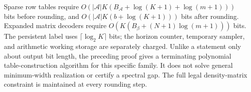 Sparse row tables require
$O(|\mathcal A|K(B_{\mathcal A}+\log(K+1)+\log(m+1)))$ bits before
rounding, and $O(|\mathcal A|K(b+\log(K+1)))$ bits after rounding.
Expanded matrix decoders require
$O(K(B_\beta+(N+1)\log(m+1)))$ bits. The persistent label uses
$\lceil\log_2 K\rceil$ bits; the horizon counter, temporary sampler, and
arithmetic working storage are separately charged. Unlike a statement
only about output bit length, the preceding proof gives a terminating
polynomial table-construction algorithm for this specific family. It
does not solve general minimum-width realization or certify a spectral
gap. The full legal density-matrix constraint is maintained at every
rounding step.
